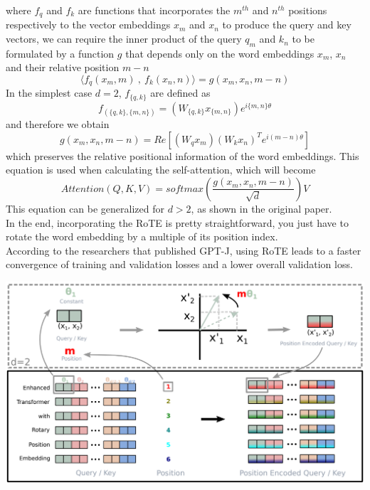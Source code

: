 where $f_q$ and $f_k$ are functions that incorporates the $m^{th}$ and $n^{th}$ positions respectively to the vector embeddings $x_m$ and $x_n$ to produce the query and key vectors, we can require the inner product of the query $q_m$ and $k_n$ to be formulated by a function $g$ that depends only on the word embeddings $x_m$, $x_n$ and their relative position $m - n$
\begin{equation*}
    \langle f_q(x_m, m) \: , \: f_k(x_n, n) \rangle = g(x_m,x_n,m-n)
\end{equation*}
In the simplest case $d=2$, $f_{\{q,k\}}$ are defined as
\begin{equation*}
    f_{(\{q,k\}, \{m,n\})} = (W_{\{q,k\}}x_{\{m,n\}})e^{i\{m,n\}\theta}
\end{equation*}
and therefore we obtain
\begin{equation*}
    g(x_m, x_n, m - n) = Re[(W_qx_m)(W_kx_n)^Te^{i(m-n)\theta}]
\end{equation*}
which preserves the relative positional information of the word embeddings. This equation is used when calculating the self-attention, which will become
\begin{equation*}
    Attention(Q,K,V) = softmax\left(\frac{g(x_m, x_n, m - n)}{\sqrt{d}}\right)V
\end{equation*}
This equation can be generalized for $d > 2$, as shown in the original paper. \\
In the end, incorporating the RoTE is pretty straightforward, you just have to rotate the word embedding by a multiple of its position index. \\
According to the researchers that published GPT-J\cite{rope-eleutherai}, using RoTE leads to a faster convergence of training and validation losses and a lower overall validation loss.

\noindent
\begin{minipage}{\linewidth}
    \includegraphics[width=\linewidth]{images/rotary_embedding_from_paper.PNG}
\end{minipage}%
    
